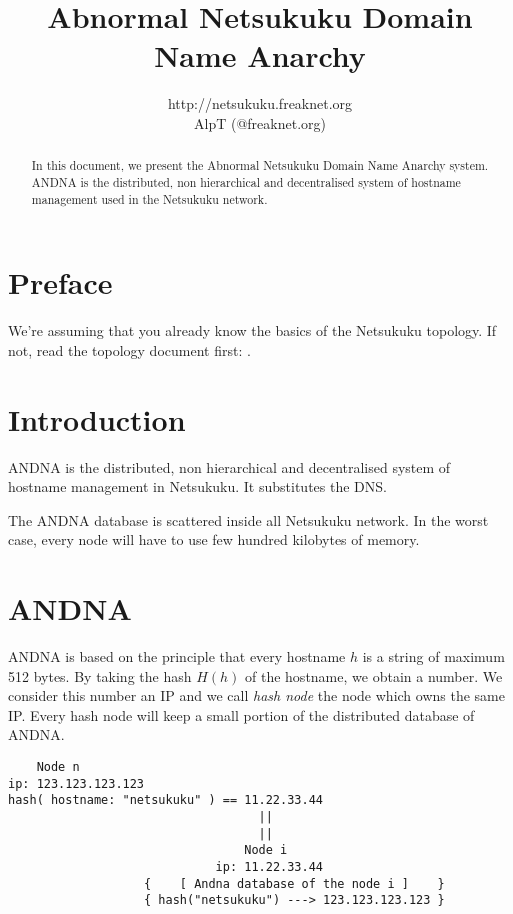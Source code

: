 \documentclass[a4paper]{article}
\title{Abnormal Netsukuku Domain Name Anarchy}
\author{http://netsukuku.freaknet.org\\AlpT (@freaknet.org)}
\begin{document}
\maketitle

\begin{abstract}
	In this document, we present the Abnormal Netsukuku Domain Name
	Anarchy system. ANDNA is the distributed, non hierarchical and
	decentralised system of hostname management used in the Netsukuku
	network.
\end{abstract}

\section{Preface}
\label{sec:preface}

We're assuming that you already know the basics of the Netsukuku topology. If not, read the
topology document first: \cite{ntktopology}.

\section{Introduction}
ANDNA is the distributed, non hierarchical and decentralised system of
hostname management in Netsukuku. It substitutes the DNS. 

The ANDNA database is scattered inside all Netsukuku network. In the worst
case, every node will have to use few hundred kilobytes of memory.

\section{ANDNA}
  
ANDNA is based on the principle that every hostname $h$ is a string of maximum
512 bytes. By taking the hash $H(h)$ of the hostname, we obtain a number.
We consider this number an IP and we call \emph{hash node} the node which owns
the same IP. Every hash node will keep a small portion of the distributed
database of ANDNA.\\

\begin{verbatim}            
    Node n
ip: 123.123.123.123
hash( hostname: "netsukuku" ) == 11.22.33.44
                                   ||
                                   ||
                                 Node i
                             ip: 11.22.33.44
                   {    [ Andna database of the node i ]    }
                   { hash("netsukuku") ---> 123.123.123.123 }
\end{verbatim}
\end{document}
